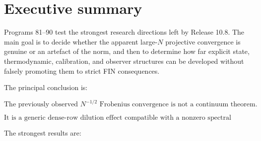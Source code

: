 \documentclass[11pt,a4paper,openany]{report}
\begin{document}
\chapter{Executive summary}

Programs 81--90 test the strongest research directions left by Release 10.8. The main goal is to decide whether the apparent large-\(N\) projective convergence is genuine or an artefact of the norm, and then to determine how far explicit state, thermodynamic, calibration, and observer structures can be developed without falsely promoting them to strict FIN consequences.

The principal conclusion is:

\[
\boxed{
\text{The previously observed }N^{-1/2}\text{ Frobenius convergence is not a continuum theorem.}
}
\]

\[
\boxed{
\text{It is a generic dense-row dilution effect compatible with a nonzero spectral obstruction.}
}
\]

The strongest results are:
\end{document}
